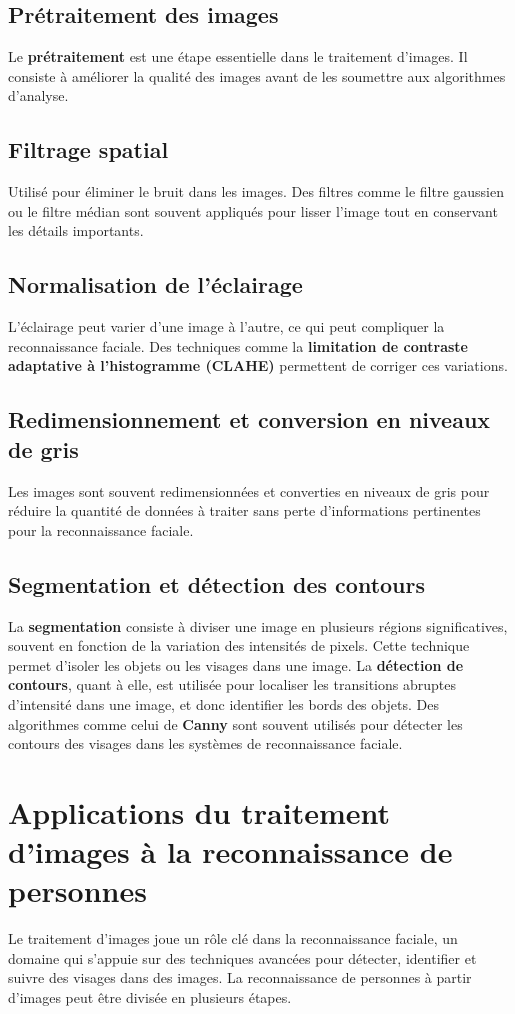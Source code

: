 \documentclass[a4paper,12pt]{report}
\begin{document}
\subsection{Prétraitement des images}
Le \textbf{prétraitement} est une étape essentielle dans le traitement d'images. Il consiste à améliorer la qualité des images avant de les soumettre aux algorithmes d'analyse.

\subsection{Filtrage spatial}
Utilisé pour éliminer le bruit dans les images. Des filtres comme le filtre gaussien ou le filtre médian sont souvent appliqués pour lisser l’image tout en conservant les détails importants.

\subsection{Normalisation de l'éclairage}
L'éclairage peut varier d'une image à l'autre, ce qui peut compliquer la reconnaissance faciale. Des techniques comme la \textbf{limitation de contraste adaptative à l'histogramme (CLAHE)} permettent de corriger ces variations.

\subsection{Redimensionnement et conversion en niveaux de gris}
Les images sont souvent redimensionnées et converties en niveaux de gris pour réduire la quantité de données à traiter sans perte d'informations pertinentes pour la reconnaissance faciale.

\subsection{Segmentation et détection des contours}
La \textbf{segmentation} consiste à diviser une image en plusieurs régions significatives, souvent en fonction de la variation des intensités de pixels. Cette technique permet d'isoler les objets ou les visages dans une image. La \textbf{détection de contours}, quant à elle, est utilisée pour localiser les transitions abruptes d'intensité dans une image, et donc identifier les bords des objets. Des algorithmes comme celui de \textbf{Canny} sont souvent utilisés pour détecter les contours des visages dans les systèmes de reconnaissance faciale.

\section{Applications du traitement d'images à la reconnaissance de personnes}
Le traitement d'images joue un rôle clé dans la reconnaissance faciale, un domaine qui s’appuie sur des techniques avancées pour détecter, identifier et suivre des visages dans des images. La reconnaissance de personnes à partir d’images peut être divisée en plusieurs étapes.
\end{document}
